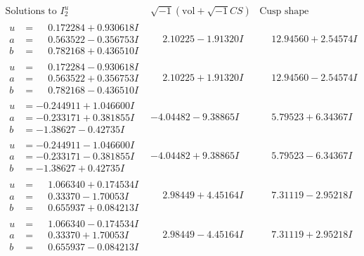 \documentclass[1p]{elsarticle_modified}
\theoremstyle{definition}
\newcommand{\I}{\sqrt{-1}}
\begin{document}
$$\begin{array}{c|c|c}  
\text{Solutions to }I^u_{2}& \I (\text{vol} + \sqrt{-1}CS) & \text{Cusp shape}\\
 \hline 
\begin{aligned}
u &= \phantom{-}0.172284 + 0.930618 I \\
a &= \phantom{-}0.563522 - 0.356753 I \\
b &= \phantom{-}0.782168 + 0.436510 I\end{aligned}
 & \phantom{-}2.10225 - 1.91320 I & \phantom{-}12.94560 + 2.54574 I \\ \hline\begin{aligned}
u &= \phantom{-}0.172284 - 0.930618 I \\
a &= \phantom{-}0.563522 + 0.356753 I \\
b &= \phantom{-}0.782168 - 0.436510 I\end{aligned}
 & \phantom{-}2.10225 + 1.91320 I & \phantom{-}12.94560 - 2.54574 I \\ \hline\begin{aligned}
u &= -0.244911 + 1.046600 I \\
a &= -0.233171 + 0.381855 I \\
b &= -1.38627 - 0.42735 I\end{aligned}
 & -4.04482 - 9.38865 I & \phantom{-}5.79523 + 6.34367 I \\ \hline\begin{aligned}
u &= -0.244911 - 1.046600 I \\
a &= -0.233171 - 0.381855 I \\
b &= -1.38627 + 0.42735 I\end{aligned}
 & -4.04482 + 9.38865 I & \phantom{-}5.79523 - 6.34367 I \\ \hline\begin{aligned}
u &= \phantom{-}1.066340 + 0.174534 I \\
a &= \phantom{-}0.33370 - 1.70053 I \\
b &= \phantom{-}0.655937 + 0.084213 I\end{aligned}
 & \phantom{-}2.98449 + 4.45164 I & \phantom{-}7.31119 - 2.95218 I \\ \hline\begin{aligned}
u &= \phantom{-}1.066340 - 0.174534 I \\
a &= \phantom{-}0.33370 + 1.70053 I \\
b &= \phantom{-}0.655937 - 0.084213 I\end{aligned}
 & \phantom{-}2.98449 - 4.45164 I & \phantom{-}7.31119 + 2.95218 I \\ \hline\begin{aligned}

\end{aligned}
\end{array}$$
\end{document}

